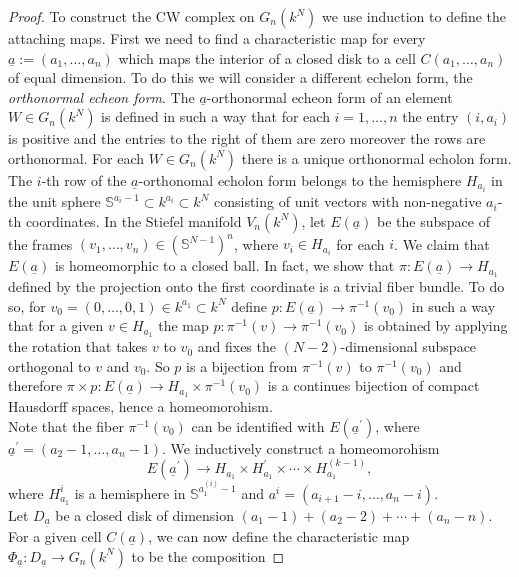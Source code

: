 \documentclass[a4paper,openany]{scrbook}
\begin{document}
\begin{proof}
To construct the CW complex on $G_n(k^N)$ we use induction to define the attaching maps. First we need to find a characteristic map for every $\underline{a}:=(a_1,\dots ,a_n)$ which maps the interior of a closed disk to a cell $C(a_1,\dots ,a_n)$ of equal dimension. To do this we will consider a different echelon form, the \textit{orthonormal echeon form}. The $\underline{a}$-orthonormal echeon form of an element $W\in G_n(k^N)$ is defined in such a way that for each $i=1,\dots , n$ the entry $(i,a_i)$ is positive and the entries to the right of them are zero moreover the rows are orthonormal. For each $W\in G_n(k^N)$ there is a unique orthonormal echolon form.\\ 
The $i$-th row of the $\underline{a}$-orthonomal echolon form belongs to the hemisphere $H_{a_i}$ in the unit sphere $\mathbb{S}^{a_i-1}\subset k^{a_i}\subset k^N$ consisting of unit vectors with non-negative $a_i$-th coordinates. In the Stiefel manifold $V_n(k^N)$, let $E(\underline{a})$ be the subspace of the frames $(v_1,\dots ,v_n)\in (\mathbb{S}^{N-1})^n$, where $v_i\in H_{a_i}$ for each $i$. We claim that $E(\underline{a})$ is homeomorphic to a closed ball. In fact, we show that  $\pi :E(\underline{a})\longrightarrow H_{a_1}$ defined by the projection onto the first coordinate is a trivial fiber bundle. To do so, for $v_0=(0,\dots ,0,1)\in  k^{a_1}\subset k^N$ define $p:E(\underline{a})\longrightarrow \pi^{-1}(v_0)$ in such a way that for a given $v\in H_{a_1}$ the map $p:\pi^{-1}(v)\longrightarrow \pi^{-1}(v_0)$ is obtained by applying the rotation that takes $v$ to $v_0$ and fixes the $(N-2)$-dimensional subspace orthogonal to $v$ and $v_0$. So $p$ is a bijection from $\pi^{-1}(v)$ to $\pi^{-1}(v_0)$ and therefore $\pi\times p :E(\underline{a})\longrightarrow H_{a_1}\times \pi^{-1}(v_0)$ is a continues bijection of compact Hausdorff spaces, hence a homeomorohism. \\
Note that the fiber $\pi^{-1}(v_0)$ can be identified with $E(\underline{a}^\prime)$, where $\underline{a}^\prime=(a_2-1,\dots ,a_n-1)$. We inductively construct a homeomorohism
$$
E(\underline{a}^\prime)\longrightarrow H_{a_1}\times H^\prime_{a_1}\times \cdots \times H^{(k-1)}_{a_1},
$$
where $H^{i}_{a_1}$ is a hemisphere in $\mathbb{S}^{{a}^{(i)}_1-1}$ and $a^{i}=(a_{i+1}-i,\dots ,a_n-i)$.\\
Let $D_{\underline{a}}$ be a closed disk of dimension $(a_1-1)+(a_2-2)+\cdots +(a_n-n)$. For a given cell $C(\underline{a})$, we can now define the characteristic map $\Phi_{\underline{a}}: D_{\underline{a}}\rightarrow G_n(k^N)$ to be the composition 

\end{proof}
\end{document}
